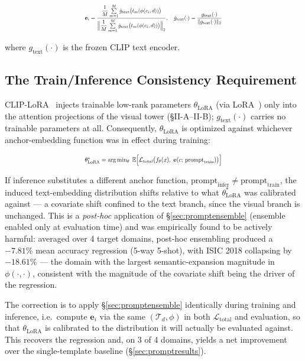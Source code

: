 \documentclass[conference]{IEEEtran}
\begin{document}
\begin{equation}
\resizebox{0.48\textwidth}{!}{$
\mathbf{e}_i = \dfrac{\dfrac{1}{M}\sum\limits_{m=1}^{M} \hat{g}_{\text{text}}\big(t_m(\phi(c_i,d))\big)}{\Big\|\dfrac{1}{M}\sum\limits_{m=1}^{M} \hat{g}_{\text{text}}\big(t_m(\phi(c_i,d))\big)\Big\|_2}, \quad \hat{g}_{\text{text}}(\cdot) = \dfrac{g_{\text{text}}(\cdot)}{\|g_{\text{text}}(\cdot)\|_2}
$}
\end{equation}

where $g_{\text{text}}(\cdot)$ is the frozen CLIP text encoder.

\subsection{The Train/Inference Consistency Requirement} \label{sec:consistency}

CLIP-LoRA~\cite{zanella2024cliplora} injects trainable low-rank parameters $\theta_{\text{LoRA}}$ (via LoRA~\cite{hu2022lora}) only into the attention projections of the visual tower (\S II-A--II-B); $g_{\text{text}}(\cdot)$ carries no trainable parameters at all. Consequently, $\theta_{\text{LoRA}}$ is optimized against whichever anchor-embedding function was in effect during training:

\begin{equation}
\resizebox{0.48\textwidth}{!}{$
\theta_{\text{LoRA}}^{*} = \arg\min_{\theta} \; \mathbb{E}\Big[\mathcal{L}_{\text{total}}\big(f_\theta(x),\; \mathbf{e}(c;\,\text{prompt}_{\text{train}})\big)\Big]
$}
\end{equation}

If inference substitutes a different anchor function, $\text{prompt}_{\text{infer}} \neq \text{prompt}_{\text{train}}$, the induced text-embedding distribution shifts relative to what $\theta_{\text{LoRA}}^{*}$ was calibrated against --- a covariate shift confined to the text branch, since the visual branch is unchanged. This is a \emph{post-hoc} application of \S\ref{sec:promptensemble} (ensemble enabled only at evaluation time) and was empirically found to be actively harmful: averaged over 4 target domains, post-hoc ensembling produced a $-7.81\%$ mean accuracy regression (5-way 5-shot), with ISIC 2018 collapsing by $-18.61\%$ --- the domain with the largest semantic-expansion magnitude in $\phi(\cdot,\cdot)$, consistent with the magnitude of the covariate shift being the driver of the regression.

The correction is to apply \S\ref{sec:promptensemble} identically during training and inference, i.e.\ compute $\mathbf{e}_i$ via the same $(\mathcal{T}_d,\phi)$ in both $\mathcal{L}_{\text{total}}$ and evaluation, so that $\theta_{\text{LoRA}}$ is calibrated to the distribution it will actually be evaluated against. This recovers the regression and, on 3 of 4 domains, yields a net improvement over the single-template baseline (\S\ref{sec:promptresults}).
\end{document}
